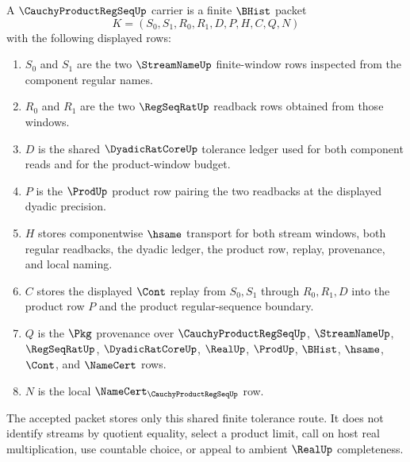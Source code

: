 \begin{definition}
\label{def:cauchy-product-regseq-carrier}
A $\CauchyProductRegSeqUp$ carrier is a finite $\BHist$ packet
$$
K=(S_0,S_1,R_0,R_1,D,P,H,C,Q,N)
$$
with the following displayed rows:
\begin{enumerate}
\item $S_0$ and $S_1$ are the two $\StreamNameUp$ finite-window rows inspected from the component regular names.
\item $R_0$ and $R_1$ are the two $\RegSeqRatUp$ readback rows obtained from those windows.
\item $D$ is the shared $\DyadicRatCoreUp$ tolerance ledger used for both component reads and for the product-window budget.
\item $P$ is the $\ProdUp$ product row pairing the two readbacks at the displayed dyadic precision.
\item $H$ stores componentwise $\hsame$ transport for both stream windows, both regular readbacks, the dyadic ledger, the product row, replay, provenance, and local naming.
\item $C$ stores the displayed $\Cont$ replay from $S_0,S_1$ through $R_0,R_1,D$ into the product row $P$ and the product regular-sequence boundary.
\item $Q$ is the $\Pkg$ provenance over $\CauchyProductRegSeqUp$, $\StreamNameUp$, $\RegSeqRatUp$, $\DyadicRatCoreUp$, $\RealUp$, $\ProdUp$, $\BHist$, $\hsame$, $\Cont$, and $\NameCert$ rows.
\item $N$ is the local $\NameCert_{\CauchyProductRegSeqUp}$ row.
\end{enumerate}
The accepted packet stores only this shared finite tolerance route. It does not identify streams by quotient equality, select a product limit, call on host real multiplication, use countable choice, or appeal to ambient $\RealUp$ completeness.
\end{definition}

